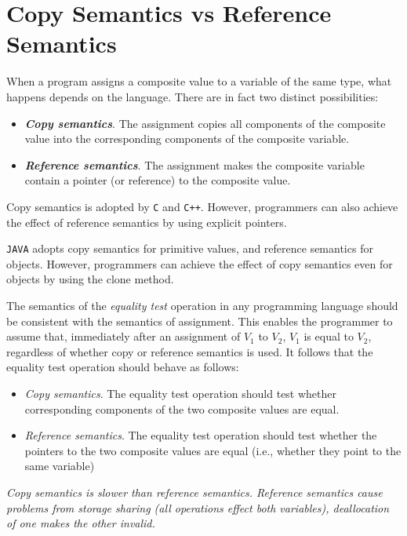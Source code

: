 \section{Copy Semantics vs Reference Semantics}

When a program assigns a composite value to a variable of the same type, what happens depends on the language. There are in fact two distinct possibilities:
\begin{itemize}
  \item \textit{\textbf{Copy semantics}}. The assignment copies all components of the composite value into the corresponding components of the composite variable.
  \item \textit{\textbf{Reference semantics}}. The assignment makes the composite variable contain a pointer (or reference) to the composite value.
\end{itemize}

Copy semantics is adopted by \texttt{C} and \texttt{C++}. However, programmers can also achieve the effect of reference semantics by using explicit pointers.

\texttt{JAVA} adopts copy semantics for primitive values, and reference semantics for objects. However, programmers can achieve the effect of copy semantics even for objects by using the clone method.

The semantics of the \textit{equality test} operation in any programming language should be consistent with the semantics of assignment. This enables the programmer to assume that, immediately after an assignment of  $V_1$ to $V_2$, $V_1$ is equal to $V_2$, regardless of whether copy or reference semantics is used. It follows that the equality test operation should behave as follows:
\begin{itemize}
  \item \textit{Copy semantics}. The equality test operation should test whether corresponding components of the two composite values are equal.
  \item \textit{Reference semantics}. The equality test operation should test whether the pointers to the two composite values are equal (i.e., whether they point to the same variable)
\end{itemize}

\textit{Copy semantics is slower than reference semantics. Reference semantics cause problems from storage sharing (all operations effect both variables), deallocation of one makes the other invalid.}

